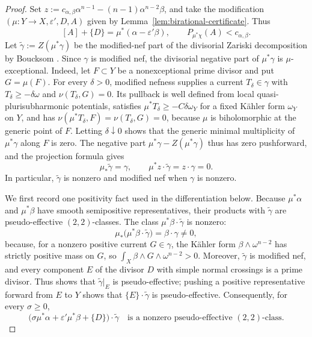 \documentclass[reqno]{amsart}
\newcommand{\cab}{c_{\alpha,\beta}}
\theoremstyle{plain}
\theoremstyle{remark}
\begin{document}
\begin{proof}
Set $z:=\cab\alpha^{n-1}-(n-1)\alpha^{n-2}\beta$, and take the
modification $(\mu:Y\to X,\varepsilon',D,A)$ given by
Lemma~\ref{lem:birational-certificate}.
Thus
\[
 [A]+\{D\}=\mu^*(\alpha-\varepsilon'\beta),
 \qquad P_{\mu^*\chi}(A)<\cab.
\]
Let $\widetilde\gamma:=Z(\mu^*\gamma)$ be the modified-nef part of
the divisorial Zariski decomposition by Boucksom
\cite[Proposition~3.10]{B04}. Since $\gamma$ is modified nef, the
divisorial negative part of $\mu^*\gamma$ is $\mu$-exceptional.
Indeed, let $F\subset Y$ be a nonexceptional prime divisor and put
$G=\mu(F)$. For every $\delta>0$, modified nefness supplies a current
$T_\delta\in\gamma$ with $T_\delta\geq-\delta\omega$ and
$\nu(T_\delta,G)=0$. Its pullback is well defined from local
quasi-plurisubharmonic potentials, satisfies
$\mu^*T_\delta\geq-C\delta\omega_Y$ for a fixed K\"ahler form
$\omega_Y$ on $Y$, and has
$\nu(\mu^*T_\delta,F)=\nu(T_\delta,G)=0$, because $\mu$ is
biholomorphic at the generic point of $F$. Letting $\delta\downarrow0$
shows that the generic minimal multiplicity of $\mu^*\gamma$ along
$F$ is zero. The negative part
$\mu^*\gamma-Z(\mu^*\gamma)$ thus
has zero pushforward, and the projection formula gives
\[
 \mu_*\widetilde\gamma=\gamma,\qquad
 \mu^*z\cdot\widetilde\gamma=z\cdot\gamma=0.
\]
In particular, $\widetilde\gamma$ is nonzero and modified nef when $\gamma$ is nonzero.

We first record one positivity fact used in the differentiation below.
Because $\mu^*\alpha$ and $\mu^*\beta$ have smooth semipositive
representatives, their products with $\widetilde\gamma$ are
pseudo-effective $(2,2)$-classes. The class
$\mu^*\beta\cdot\widetilde\gamma$ is nonzero:
\[
 \mu_*\bigl(\mu^*\beta\cdot\widetilde\gamma\bigr)
 =\beta\cdot\gamma\ne0,
\]
because, for a nonzero positive current $G\in\gamma$, the K\"ahler
form $\beta\wedge\omega^{n-2}$ has strictly positive mass on $G$, so
$\int_X\beta\wedge G\wedge\omega^{n-2}>0$. Moreover,
$\widetilde\gamma$ is modified nef, and every component $E$ of the
divisor $D$ with simple normal crossings is a prime divisor. Thus
\cite[Proposition~2.4]{B04} shows that
$\widetilde\gamma|_E$ is pseudo-effective; pushing a positive
representative forward from $E$ to $Y$ shows that
$\{E\}\cdot\widetilde\gamma$ is
pseudo-effective.  Consequently, for every $\sigma\geq0$,
\[
 \bigl(\sigma\mu^*\alpha+\varepsilon'\mu^*\beta+\{D\}\bigr)
 \cdot\widetilde\gamma
 \quad\text{is a nonzero pseudo-effective $(2,2)$-class.}
\]


\end{proof}
\end{document}
